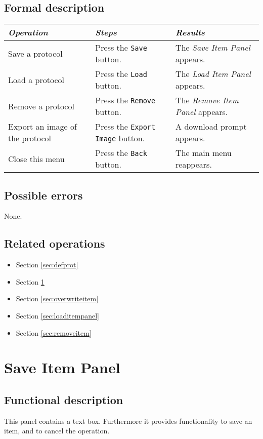   \subsection*{Formal description}
    \begin{tabularx}{\textwidth}{XXX}
    \toprule
    \emph{Operation} & \emph{Steps} & \emph{Results} \\
    \midrule
    Save a protocol & Press the \texttt{Save} button. & The \emph{Save Item Panel} appears. \\
    \midrule
    Load a protocol & Press the \texttt{Load} button. & The \emph{Load Item Panel} appears. \\
    \midrule
    Remove a protocol & Press the \texttt{Remove} button. & The \emph{Remove Item Panel} appears. \\
    \midrule
    Export an image of the protocol & Press the \texttt{Export Image} button. & A download prompt appears. \\
    \midrule
    Close this menu & Press the \texttt{Back} button. & The main menu reappears.
    \bottomrule
  \end{tabularx}

  \subsection*{Possible errors}
  None.
  
  \subsection*{Related operations}
    \begin{itemize}
    \item Section \ref{sec:defprot}
    \item Section \ref{sec:saveitem}
    \item Section \ref{sec:overwriteitem}
    \item Section \ref{sec:loaditempanel}
    \item Section \ref{sec:removeitem}
  \end{itemize}

\section{Save Item Panel}
\label{sec:saveitem}
  \subsection*{Functional description}
  This panel contains a text box. Furthermore it provides functionality to save an item, and to cancel the operation.

